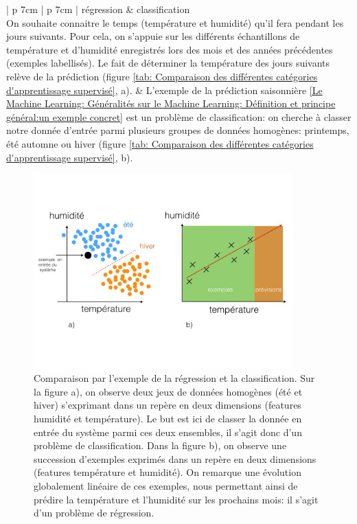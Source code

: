 \begin{table}[h]
	\begin{tabular}{ | p {7cm} | p {7cm} |}
		\hline
		régression & classification \\
		\hline
		On souhaite connaitre le temps (température et humidité) qu'il fera pendant les jours suivants. Pour cela, on s'appuie sur les différents échantillons de température et d'humidité enregistrés lors des mois et des années précédentes (exemples labellisés). Le fait de déterminer la température des jours suivants relève de la prédiction (figure \ref {tab: Comparaison des différentes catégories d'apprentissage supervisé}, a).  
		 &  L'exemple de la prédiction saisonnière \ref{Le Machine Learning: Généralités sur le Machine Learning: Définition et principe général:un exemple concret} est un problème de classification: on cherche à classer notre donnée d'entrée parmi plusieurs groupes de données homogènes: printemps, été automne ou hiver (figure \ref {tab: Comparaison des différentes catégories d'apprentissage supervisé}, b). \\
		\hline 
	\end{tabular}
	\caption[Comparaison des différentes catégories d'apprentissage supervisé]{Comparaison entre l'apprentissage supervisé de type régression et supervisé de type classification}
	\label {tab: Comparaison des différentes catégories d'apprentissage supervisé}
\end{table}

\begin{figure}[h]
	\centering\includegraphics[height=7.5cm]{images/regression_class.jpeg}
	\caption[Comparaison par l'exemple de la régression et la classification]{Comparaison par l'exemple de la régression et la classification. Sur la figure a), on observe deux jeux de données homogènes (été et hiver) s'exprimant dans un repère en deux dimensions (features humidité et température). Le but est ici de classer la donnée en entrée du système parmi ces deux ensembles, il s'agit donc d'un problème de classification. Dans la figure b), on observe une succession d'exemples exprimés dans un repère en deux dimensions (features température et humidité). On remarque une évolution globalement linéaire de ces exemples, nous permettant ainsi de prédire la température et l'humidité sur les prochains mois: il s'agit d'un problème de régression.}
	\label{fig:Comparaison par l'exemple de la régression et la classification}
\end{figure}





